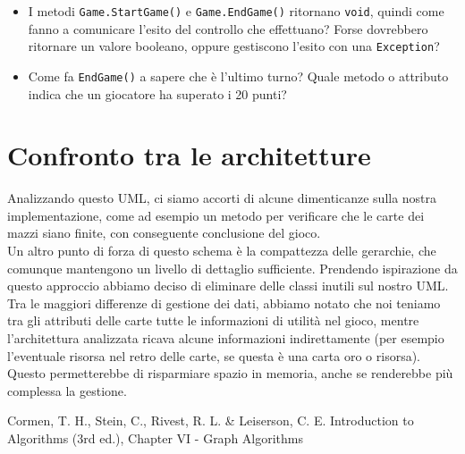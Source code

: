 \documentclass[12pt]{article}
\begin{document}
\begin{itemize}
    \item I metodi \texttt{Game.StartGame()} e \texttt{Game.EndGame()} ritornano \texttt{void}, quindi come fanno a comunicare l'esito del controllo che effettuano? Forse dovrebbero ritornare un valore booleano, oppure gestiscono l'esito con una \texttt{Exception}?

    \item Come fa \texttt{EndGame()} a sapere che è l'ultimo turno? Quale metodo o attributo indica che un giocatore ha superato i 20 punti?

\end{itemize}

\section{Confronto tra le architetture}

Analizzando questo UML, ci siamo accorti di alcune dimenticanze sulla nostra implementazione, come ad esempio un metodo per verificare che le carte dei mazzi siano finite, con conseguente conclusione del gioco.\\
Un altro punto di forza di questo schema è la compattezza delle gerarchie, che comunque mantengono un livello di dettaglio sufficiente. Prendendo ispirazione da questo approccio abbiamo deciso di eliminare delle classi inutili sul nostro UML.\\
Tra le maggiori differenze di gestione dei dati, abbiamo notato che noi teniamo tra gli attributi delle carte tutte le informazioni di utilità nel gioco, mentre l'architettura analizzata ricava alcune informazioni indirettamente (per esempio l'eventuale risorsa nel retro delle carte, se questa è una carta oro o risorsa). Questo permetterebbe di risparmiare spazio in memoria, anche se renderebbe più complessa la gestione.

\begin{thebibliography}{9}
Cormen, T. H., Stein, C., Rivest, R. L. \& Leiserson, C. E. Introduction to
Algorithms (3rd ed.), Chapter VI - Graph Algorithms
\end{thebibliography}
\end{document}
